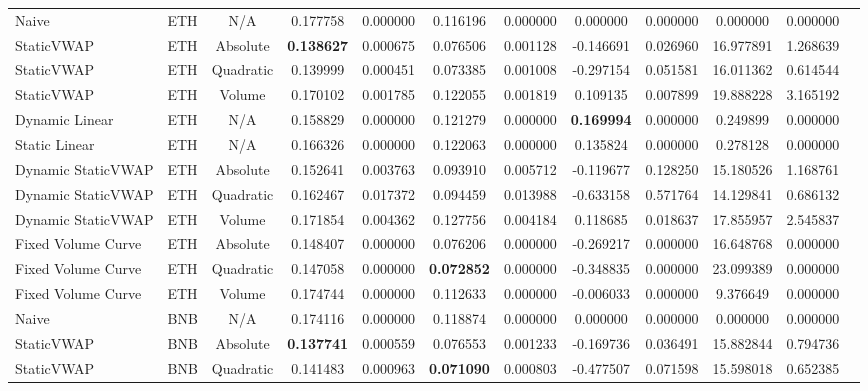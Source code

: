 \begin{table}[H]
{\begin{tabular}{llcccccccccc}
        \hline
        Naive & ETH & N/A & 0.177758 & 0.000000 & 0.116196 & 0.000000 & 0.000000 & 0.000000 & 0.000000 & 0.000000 \\
        StaticVWAP & ETH & Absolute & \textbf{0.138627} & 0.000675 & 0.076506 & 0.001128 & -0.146691 & 0.026960 & 16.977891 & 1.268639 \\
        StaticVWAP & ETH & Quadratic & 0.139999 & 0.000451 & 0.073385 & 0.001008 & -0.297154 & 0.051581 & 16.011362 & 0.614544 \\
        StaticVWAP & ETH & Volume & 0.170102 & 0.001785 & 0.122055 & 0.001819 & 0.109135 & 0.007899 & 19.888228 & 3.165192 \\
        Dynamic Linear & ETH & N/A & 0.158829 & 0.000000 & 0.121279 & 0.000000 & \textbf{0.169994} & 0.000000 & 0.249899 & 0.000000 \\
        Static Linear & ETH & N/A & 0.166326 & 0.000000 & 0.122063 & 0.000000 & 0.135824 & 0.000000 & 0.278128 & 0.000000 \\
        Dynamic StaticVWAP & ETH & Absolute & 0.152641 & 0.003763 & 0.093910 & 0.005712 & -0.119677 & 0.128250 & 15.180526 & 1.168761 \\
        Dynamic StaticVWAP & ETH & Quadratic & 0.162467 & 0.017372 & 0.094459 & 0.013988 & -0.633158 & 0.571764 & 14.129841 & 0.686132 \\
        Dynamic StaticVWAP & ETH & Volume & 0.171854 & 0.004362 & 0.127756 & 0.004184 & 0.118685 & 0.018637 & 17.855957 & 2.545837 \\
        Fixed Volume Curve & ETH & Absolute & 0.148407 & 0.000000 & 0.076206 & 0.000000 & -0.269217 & 0.000000 & 16.648768 & 0.000000 \\
        Fixed Volume Curve & ETH & Quadratic & 0.147058 & 0.000000 & \textbf{0.072852} & 0.000000 & -0.348835 & 0.000000 & 23.099389 & 0.000000 \\
        Fixed Volume Curve & ETH & Volume & 0.174744 & 0.000000 & 0.112633 & 0.000000 & -0.006033 & 0.000000 & 9.376649 & 0.000000 \\
        \hline
        Naive & BNB & N/A & 0.174116 & 0.000000 & 0.118874 & 0.000000 & 0.000000 & 0.000000 & 0.000000 & 0.000000 \\
        StaticVWAP & BNB & Absolute & \textbf{0.137741} & 0.000559 & 0.076553 & 0.001233 & -0.169736 & 0.036491 & 15.882844 & 0.794736 \\
        StaticVWAP & BNB & Quadratic & 0.141483 & 0.000963 & \textbf{0.071090} & 0.000803 & -0.477507 & 0.071598 & 15.598018 & 0.652385 \\

\end{tabular}}
\end{table}
